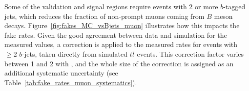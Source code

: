 \begin{table}[t!]
\def\arraystretch{1.15}
\caption{Muon fake rate measured in data and the associated statistical uncertainty. 
The systematic uncertainty originating from the subtraction of ``backgrounds'' with only prompt leptons is also displayed. }
\label{table:fake_rates_muon}
\def\arraystretch{1.15}
\centering
{}



\end{table}

Some of the validation and signal regions require events with 2 or more $b$-tagged jets, 
which reduces the fraction of non-prompt muons coming from $B$ meson decays. 
Figure~\ref{fig:fakes_MC_vsBjets_muon} illustrates how this impacts 
the fake rates. 
Given the good agreement between data and simulation for the measured values, 
a correction is applied to the measured rates for events with $\ge 2$ $b$-jets, 
taken directly from simulated $t\bar t$ events. 
This correction factor varies between 1 and 2 with \pt, 
and the whole size of the correction is assigned as an additional systematic uncertainty (see Table~\ref{tab:fake_rates_muon_systematics}). 

